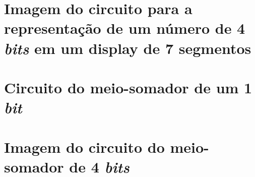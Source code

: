 
\begin{apendicesenv}

\partapendices

\chapter{Imagem do circuito para a representação de um número de 4 \textit{bits} em um display de 7 segmentos}
	\label{apendice:CircuitoEtapa1}
	

	\chapter{Circuito do meio-somador de um 1 \textit{bit}}
		\label{apendice:CircuitoEtapa2}
		

\chapter{Imagem do circuito do meio-somador de 4 \textit{bits}}
	



\end{apendicesenv}
